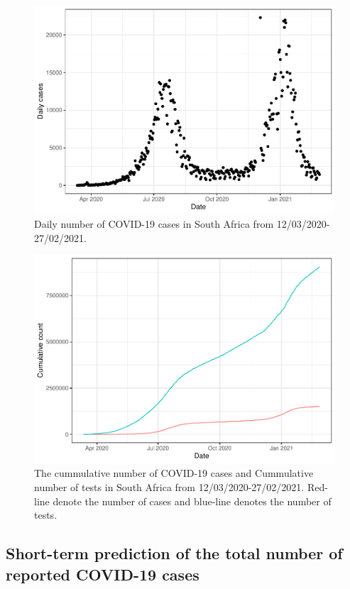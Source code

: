\documentclass[10pt,letterpaper]{article}
\begin{document}
\begin{figure}[H]
\includegraphics[width=0.99\linewidth]{COVIDincidenceSA_files/figure-latex/daily-cases-1} \caption{Daily number of COVID-19 cases in South Africa from 12/03/2020-27/02/2021.}\label{fig:daily-cases}
\end{figure}

\begin{figure}[H]
\includegraphics[width=0.99\linewidth]{COVIDincidenceSA_files/figure-latex/cummulative-1} \caption{The cummulative number of COVID-19 cases and Cummulative number of tests in South Africa from 12/03/2020-27/02/2021. Red-line denote the number of cases and blue-line denotes the number of tests.}\label{fig:cummulative}
\end{figure}

\hypertarget{short-term-prediction-of-the-total-number-of-reported-covid-19-cases}{%
\subsection{Short-term prediction of the total number of reported
COVID-19
cases}\label{short-term-prediction-of-the-total-number-of-reported-covid-19-cases}}
\end{document}
